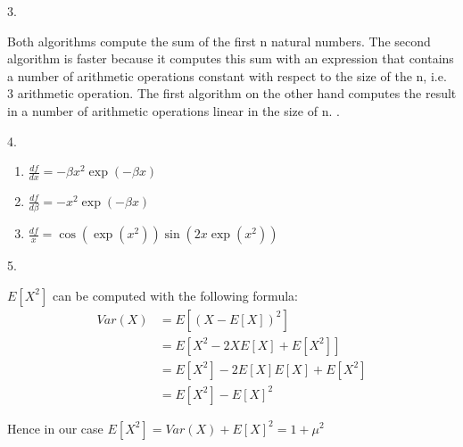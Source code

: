 3.

Both algorithms compute the sum of the first n natural numbers. The second
algorithm is faster because it computes this sum with an expression that
contains a number of arithmetic operations constant with respect to the size of
the n, i.e. 3 arithmetic operation. The first algorithm on the other hand
computes the result in a number of arithmetic operations linear in the size of
n.                                           .

4.

\begin{enumerate}
  \item $\frac{df}{dx} = -\beta x^{2} \exp(-\beta x)$
  \item $\frac{df}{d\beta} = -x^{2} \exp (-\beta x)$
  \item $\frac{df}{x} = \cos (\exp(x^{2})) \sin(2x \exp(x^{2}))$
\end{enumerate}


5.

$E[X^2]$ can be computed with the following formula:
\begin{align}
  Var(X) &= E[(X-E[X])^2] \\
         &= E[X^2 - 2XE[X] + E[X^2]]\\
         &= E[X^2] - 2E[X]E[X] + E[X^2]\\
         &= E[X^{2}] - E[X]^{2}
\end{align}

Hence in our case $E[X^{2}] = Var(X) + E[X]^{2}= 1 + \mu^{2}$


\clearpage

